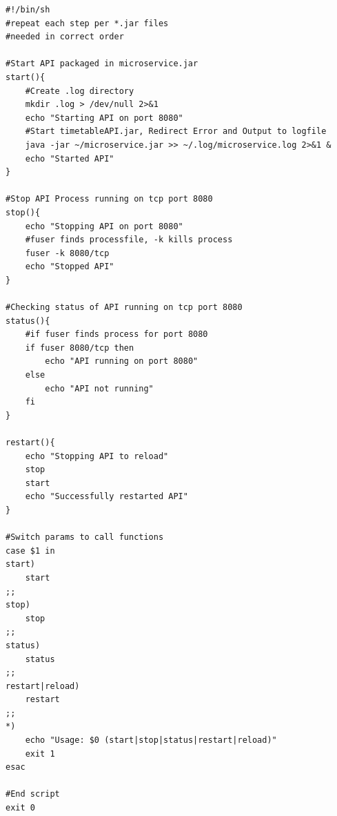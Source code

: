 \newpage
\begin{lstlisting}[caption={Skript zum Verwalten der Microservices}]
#!/bin/sh
#repeat each step per *.jar files 
#needed in correct order

#Start API packaged in microservice.jar
start(){
    #Create .log directory
    mkdir .log > /dev/null 2>&1
    echo "Starting API on port 8080"
    #Start timetableAPI.jar, Redirect Error and Output to logfile
    java -jar ~/microservice.jar >> ~/.log/microservice.log 2>&1 &
    echo "Started API"
}

#Stop API Process running on tcp port 8080
stop(){
    echo "Stopping API on port 8080"
    #fuser finds processfile, -k kills process
    fuser -k 8080/tcp
    echo "Stopped API"
}

#Checking status of API running on tcp port 8080
status(){
    #if fuser finds process for port 8080
    if fuser 8080/tcp then
        echo "API running on port 8080"
    else
        echo "API not running"
    fi
}

restart(){
    echo "Stopping API to reload"
    stop
    start
    echo "Successfully restarted API"
}

#Switch params to call functions
case $1 in
start)
    start
;;
stop)
    stop
;;
status)
    status
;;
restart|reload)
    restart
;;
*)
    echo "Usage: $0 (start|stop|status|restart|reload)"
    exit 1
esac

#End script
exit 0
\end{lstlisting}